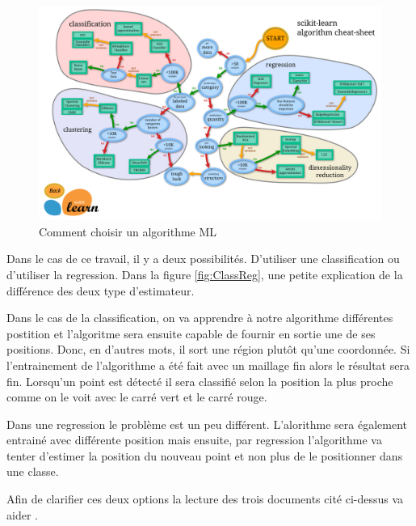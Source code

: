 \begin{figure}[htp]
	\begin{center}
		\includegraphics[scale=0.12]{figures/scikiLearn.png}
		\caption{Comment choisir un algorithme ML \cite{scikit}}
		\label{fig:scikiLearn} %
	\end{center}
\end{figure}

Dans le cas de ce travail, il y a deux possibilités. D'utiliser une classification ou d'utiliser la regression. Dans la figure \ref{fig:ClassReg}, une petite explication de la différence des deux type d'estimateur. 

Dans le cas de la classification, on va apprendre à notre algorithme différentes postition et l'algoritme sera ensuite capable de fournir en sortie une de ses positions. Donc, en d'autres mots, il sort une région plutôt qu'une coordonnée. Si l'entrainement de l'algorithme a été fait avec un maillage fin alors le résultat sera fin. Lorsqu'un point est détecté il sera classifié selon la position la plus proche comme on le voit avec le carré vert et le carré rouge. 

Dans une regression le problème est un peu différent. L'alorithme sera également entrainé avec différente position mais ensuite, par regression l'algorithme va tenter d'estimer la position du nouveau point et non plus de le positionner dans une classe. 

Afin de clarifier ces deux options la lecture des trois documents cité ci-dessus va aider \cite{ML_algo}\cite{ML_UWB}\cite{CP_RSS}. 

